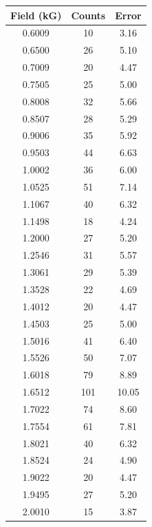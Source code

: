 \begin{table}[h!]
\begin{minipage}[b]{0.45\linewidth}\centering
\begin{tabular}{|c|c|c|} \hline
Field	(kG)&	Counts	&	Error	\\	\hline
0.6009	&	10	&	3.16	\\	\hline
0.6500	&	26	&	5.10	\\	\hline
0.7009	&	20	&	4.47	\\	\hline
0.7505	&	25	&	5.00	\\	\hline
0.8008	&	32	&	5.66	\\	\hline
0.8507	&	28	&	5.29	\\	\hline
0.9006	&	35	&	5.92	\\	\hline
0.9503	&	44	&	6.63	\\	\hline
1.0002	&	36	&	6.00	\\	\hline
1.0525	&	51	&	7.14	\\	\hline
1.1067	&	40	&	6.32	\\	\hline
1.1498	&	18	&	4.24	\\	\hline
1.2000	&	27	&	5.20	\\	\hline
1.2546	&	31	&	5.57	\\	\hline
1.3061	&	29	&	5.39	\\	\hline
1.3528	&	22	&	4.69	\\	\hline
1.4012	&	20	&	4.47	\\	\hline
1.4503	&	25	&	5.00	\\	\hline
1.5016	&	41	&	6.40	\\	\hline
1.5526	&	50	&	7.07	\\	\hline
1.6018	&	79	&	8.89	\\	\hline
1.6512	&	101	&	10.05	\\	\hline
1.7022	&	74	&	8.60	\\	\hline
1.7554	&	61	&	7.81	\\	\hline
1.8021	&	40	&	6.32	\\	\hline
1.8524	&	24	&	4.90	\\	\hline
1.9022	&	20	&	4.47	\\	\hline
1.9495	&	27	&	5.20	\\	\hline
2.0010	&	15	&	3.87	\\	\hline
\end{tabular}


\end{minipage}
\end{table}

